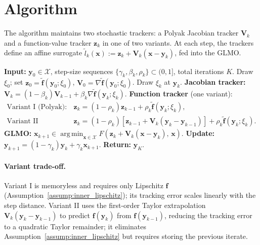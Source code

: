 \documentclass{article}
\newcommand{\cX}{\mathcal{X}}
\def\vf{{\bm{f}}}
\def\vx{{\bm{x}}}
\def\vy{{\bm{y}}}
\def\vz{{\bm{z}}}
\def\mV{{\bm{V}}}
\DeclareMathOperator*{\argmin}{arg\,min}
\begin{document}
\section{Algorithm}

The algorithm maintains two stochastic trackers: a Polyak Jacobian tracker $\mV_k$ and a function-value tracker $\vz_k$ in one of two variants. At each step, the trackers define an affine surrogate $\tilde l_k(\vx) := \vz_k + \mV_k(\vx - \vy_k)$, fed into the GLMO.

\begin{algorithm}[h]
\caption{Hybrid Momentum Stochastic Frank--Wolfe}
\label{alg:hybrid_sfw}
\begin{algorithmic}[1]
\STATE \textbf{Input:} $\vy_0 \in \cX$, step-size sequences $\{\gamma_k, \beta_k, \rho_k\} \subset (0, 1]$, total iterations $K$.
\STATE Draw $\xi_0$; set $\vz_0 \!=\! \tilde\vf(\vy_0; \xi_0)$, $\mV_0 \!=\! \nabla \tilde\vf(\vy_0; \xi_0)$.
\STATE Draw $\xi_k$ at $\vy_k$.
\STATE \textbf{Jacobian tracker:} $\mV_k = (1-\beta_k)\mV_{k-1} + \beta_k \nabla \tilde\vf(\vy_k; \xi_k)$.
\STATE \textbf{Function tracker} (one variant):
\begin{align*}
\text{Variant I (Polyak):}\quad & \vz_k = (1-\rho_k)\vz_{k-1} + \rho_k \tilde\vf(\vy_k; \xi_k), \\
\text{Variant II (Taylor):}\quad & \vz_k = (1-\rho_k)[\vz_{k-1} + \mV_k(\vy_k - \vy_{k-1})] + \rho_k \tilde\vf(\vy_k; \xi_k).
\end{align*}
\STATE \textbf{GLMO:} $\vx_{k+1} \in \argmin_{\vx \in \cX} F(\vz_k + \mV_k(\vx - \vy_k),\, \vx)$.
\STATE \textbf{Update:} $\vy_{k+1} = (1-\gamma_k)\vy_k + \gamma_k \vx_{k+1}$.
\ENDFOR
\STATE \textbf{Return:} $\vy_K$.
\end{algorithmic}
\end{algorithm}

\paragraph{Variant trade-off.}
Variant I is memoryless and requires only Lipschitz $\vf$ (Assumption~\ref{assump:inner_lipschitz}); its tracking error scales linearly with the step distance. Variant II uses the first-order Taylor extrapolation $\mV_k(\vy_k - \vy_{k-1})$ to predict $\vf(\vy_k)$ from $\vf(\vy_{k-1})$, reducing the tracking error to a quadratic Taylor remainder; it eliminates Assumption~\ref{assump:inner_lipschitz} but requires storing the previous iterate.
\end{document}
